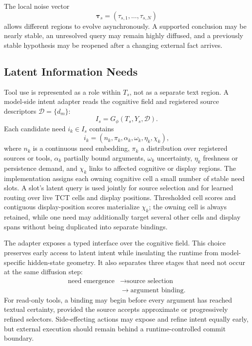 The local noise vector
\begin{equation}
  \boldsymbol{\tau}_s = (\tau_{s,1},\ldots,\tau_{s,N})
\end{equation}
allows different regions to evolve asynchronously. A supported conclusion may be nearly stable, an unresolved query may remain highly diffused, and a previously stable hypothesis may be reopened after a changing external fact arrives.

\subsection{Latent Information Needs}
\label{sec:latent-needs}

Tool use is represented as a role within $T_s$, not as a separate text region. A model-side intent adapter reads the cognitive field and registered source descriptors $\mathcal{D}=\{d_m\}$:
\begin{equation}
  I_s = G_{\phi}(T_s, Y_s, \mathcal{D}).
  \label{eq:intent-adapter}
\end{equation}
Each candidate need $i_k\in I_s$ contains
\begin{equation}
  i_k = (n_k, \pi_k, \alpha_k, \omega_k, \eta_k, \chi_k),
\end{equation}
where $n_k$ is a continuous need embedding, $\pi_k$ a distribution over registered sources or tools, $\alpha_k$ partially bound arguments, $\omega_k$ uncertainty, $\eta_k$ freshness or persistence demand, and $\chi_k$ links to affected cognitive or display regions. The implementation assigns each owning cognitive cell a small number of stable need slots. A slot's latent query is used jointly for source selection and for learned routing over live TCT cells and display positions. Thresholded cell scores and contiguous display-position scores materialize $\chi_k$; the owning cell is always retained, while one need may additionally target several other cells and display spans without being duplicated into separate bindings.

The adapter exposes a typed interface over the cognitive field. This choice preserves early access to latent intent while insulating the runtime from model-specific hidden-state geometry. It also separates three stages that need not occur at the same diffusion step:
\begin{equation}
  \begin{aligned}
    \text{need emergence} &\rightarrow \text{source selection}\\
                          &\rightarrow \text{argument binding}.
  \end{aligned}
\end{equation}
For read-only tools, a binding may begin before every argument has reached textual certainty, provided the source accepts approximate or progressively refined selectors. Side-effecting actions may expose and refine intent equally early, but external execution should remain behind a runtime-controlled commit boundary.

